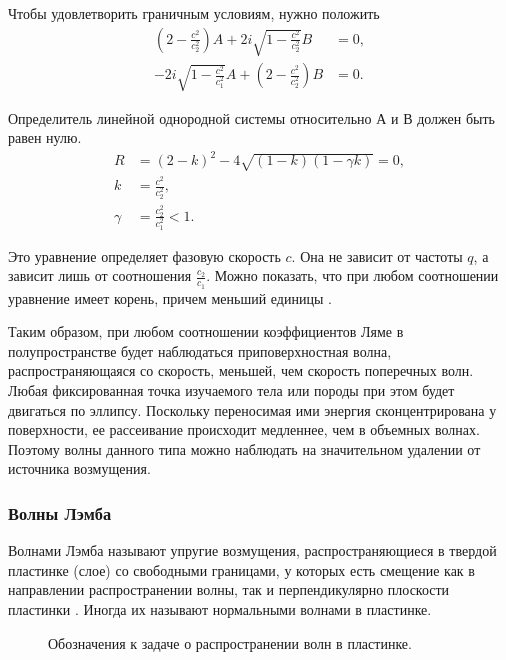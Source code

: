 Чтобы удовлетворить граничным условиям, нужно положить
\begin{align}
(2-\frac{c^2}{c_2^2})A + 2i\sqrt{1-\frac{c^2}{c_2^2}}B &= 0, \nonumber\\
-2i\sqrt{1-\frac{c^2}{c_1^2}}A + (2-\frac{c^2}{c_2^2})B &= 0.
\end{align}

Определитель линейной однородной системы относительно А и В должен быть равен нулю.
\begin{align}
R &= (2-k)^2 - 4\sqrt{(1-k)(1-\gamma k)} = 0, \nonumber\\
k &= \frac{c^2}{c_2^2}, \nonumber\\
\gamma &= \frac{c_2^2}{c_1^2} < 1.
\end{align}

Это уравнение определяет фазовую скорость $c$. Она не зависит от частоты $q$, а зависит лишь от соотношения $\frac{c_2}{c_1}$. Можно показать, что при любом соотношении уравнение имеет корень, причем меньший единицы \cite{tischenko}.

Таким образом, при любом соотношении коэффициентов Ляме в полупространстве будет наблюдаться приповерхностная волна, распространяющаяся со скорость, меньшей, чем скорость поперечных волн. Любая фиксированная точка изучаемого тела или породы при этом будет двигаться по эллипсу. Поскольку переносимая ими энергия сконцентрирована у поверхности, ее рассеивание происходит медленнее, чем в объемных волнах. Поэтому волны данного типа можно наблюдать на значительном удалении от источника возмущения.


\subsubsection{Волны Лэмба}

Волнами Лэмба называют упругие возмущения, распространяющиеся в твердой пластинке (слое) со свободными границами, у которых есть смещение как в направлении распространении волны, так и перпендикулярно плоскости пластинки \cite{viktorov}. Иногда их называют нормальными волнами в пластинке.

\begin{figure}[h]
\caption{Обозначения к задаче о распространении волн в пластинке.}
\end{figure}

